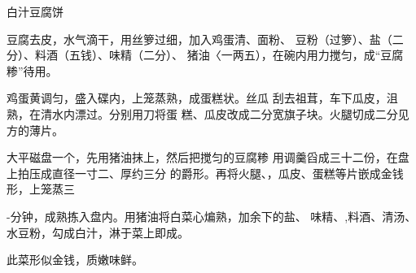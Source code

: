 \begin{recipe}[金钱豆腐]{白汁豆腐饼}

\ingredients


\cooking

\step 	豆腐去皮，水气滴干，用丝箩过细，加入鸡蛋清、面粉、 豆粉（过箩）、盐（二分）、料酒（五钱）、味精（二分）、 猪油〈一两五），在碗内用力搅匀，成“豆腐糁”待用。

\step 	鸡蛋黄调匀，盛入碟内，上笼蒸熟，成蛋糕状。丝瓜 刮去祖茸，车下瓜皮，沮熟，在清水内漂过。分别用刀将蛋 糕、瓜皮改成二分宽旗子块。火腿切成二分见方的薄片。

\step 	大平磁盘一个，先用猪油抹上，然后把搅匀的豆腐糁 用调羹舀成三十二份，在盘上拍压成直径一寸二、厚约三分 的爵形。再将火腿、，瓜皮、蛋糕等片嵌成金钱形，上笼蒸三

-分钟，成熟拣入盘内。用猪油将白菜心煸熟，加余下的盐、 味精、,料酒、清汤、水豆粉，勾成白汁，淋于菜上即成。

\notes

此菜形似金钱，质嫩味鲜。

\end{recipe}

